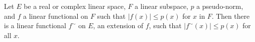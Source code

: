 Let $E$ be a real or complex linear space, $F$ a linear subspace, $p$ a pseudo-norm, and $f$ a linear functional on $F$ such that $|f(x)| \leq p(x)$ for $x$ in $F$. Then there is a linear functional $f^{\sim}$ on $E$, an extension of $f$, such that $|f^{\sim}(x)| \leq p(x)$ for all $x$.
